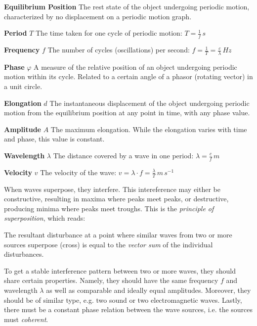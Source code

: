 \textbf{Equilibrium Position}  The rest state of the object undergoing periodic motion, characterized by no displacement on a periodic motion graph.

\textbf{Period} $T$  The time taken for one cycle of periodic motion: $T = \frac{1}{f}\, s$

\textbf{Frequency} $f$  The number of cycles (oscillations) per second: $f = \frac{1}{T} = \frac{c}{\lambda}\, Hz$

\textbf{Phase} $\varphi$  A measure of the relative position of an object undergoing periodic motion within its cycle. Related to a certain angle of a phasor (rotating vector) in a unit circle.

\textbf{Elongation} $d$  The instantaneous displacement of the object undergoing periodic motion from the equilibrium position at any point in time, with any phase value.

\textbf{Amplitude} $A$  The maximum elongation. While the elongation varies with time and phase, this value is constant.

\textbf{Wavelength} $\lambda$  The distance covered by a wave in one period: $\lambda = \frac{c}{f}\, m$

\textbf{Velocity} $v$  The velocity of the wave: $v = \lambda \cdot f = \frac{\lambda}{T}\, m\, s^{-1}$


When waves superpose, they interfere. This intereference may either be constructive, resulting in maxima where peaks meet peaks, or destructive, producing minima where peaks meet troughs. This is the \emph{principle of superposition}, which reads:

\begin{displayquote}
	The resultant disturbance at a point where similar waves from two or more sources superpose (cross) is equal to the \emph{vector sum} of the individual disturbances.
\end{displayquote}

To get a stable interference pattern between two or more waves, they should share certain properties. Namely, they should have the same frequency $f$ and wavelength $\lambda$ as well as comparable and ideally equal amplitudes. Moreover, they should be of similar type, e.g. two sound or two electromagnetic waves. Lastly, there must be a constant phase relation between the wave sources, i.e. the sources must \emph{coherent}. 


